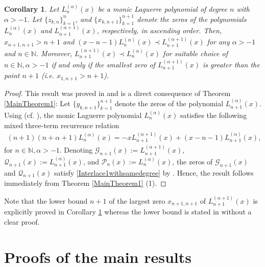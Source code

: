 \documentclass[final,3p,times,12pt]{elsarticle}
\newtheorem{corollary}{Corollary}[section]
\numberwithin{equation}{section}  %
\def\a{\alpha}
\begin{document}
\begin{corollary}\cite[Theorem 2.1]{Arvesu-Driver-Littlejohn-ITSF-2021}\label{interlaceLaguerre-n_a-n+1_a+1}
	Let $L^{(\alpha)}_n(x)$ be a monic Laguerre polynomial of degree $n$ with $\a>-1$. Let $\{z_{k,n}\}_{k=1}^{n}$, and  $\{x_{k,n+1}\}_{k=1}^{n+1}$ denote the zeros of the polynomials $L^{(\alpha)}_n(x)$ and $L^{(\alpha+1)}_{n+1}(x)$, respectively, in ascending order.  Then, $x_{n+1,n+1}>n+1$ and $(x-n-1)L^{(\alpha)}_n(x)\prec L^{(\alpha+1)}_{n+1}(x)$ for any $\alpha>-1$ and $n\in \mathbb{N}$. Moreover, $L^{(\alpha+1)}_{n+1}(x)\prec L^{(\alpha)}_n(x)$  for suitable choice of $n\in \mathbb{N}, \alpha>-1$ if and only if the smallest zero of $L^{(\alpha+1)}_{n+1}(x)$ is greater than the point $n+1$ (i.e. $x_{1,n+1}>n+1$).
\end{corollary}
\begin{proof} 
	This result was proved in \cite[Theorem 2.1]{Arvesu-Driver-Littlejohn-ITSF-2021} and is a direct consequence of Theorem \ref{MainTheorem1}: Let  $\{y_{k,n+1}\}_{k=1}^{n+1}$ denote the zeros of the polynomial $L^{(\alpha)}_{n+1}(x)$. Using (cf. \cite[eq.~(1)]{Driver-Jordaan-NumerMath-2007}), the monic Laguerre polynomial $L^{(\alpha)}_n(x)$ satisfies the following mixed three-term recurrence relation
	\begin{align}
		(n+1)(n+\alpha+1)L^{(\alpha)}_n(x)=-xL^{(\alpha+1)}_{n+1}(x)+(x-n-1)L^{(\alpha)}_{n+1}(x),
	\end{align}
	for $n\in \mathbb{N}, \alpha>-1$. Denoting $\mathcal{G}_{n+1}(x):=L^{(\alpha+1)}_{n+1}(x)$, $\mathcal{Q}_{n+1}(x):=L^{(\alpha)}_{n+1}(x)$, and $\mathcal{P}_n(x):=L^{(\alpha)}_n(x)$, the zeros of $\mathcal{G}_{n+1}(x)$ and $\mathcal{Q}_{n+1}(x)$ satisfy \eqref{Interlace1withsamedegree} by \cite[Theorem 2.3]{Driver-Jordaan-NumerMath-2007}. Hence, the result follows immediately from Theorem \ref{MainTheorem1} (1).
\end{proof}

Note that the lower bound $n+1$ of the largest zero $x_{n+1,n+1}$ of $L^{(\alpha+1)}_{n+1}(x)$ is explicitly proved in Corollary \ref{interlaceLaguerre-n_a-n+1_a+1} whereas the lower bound is stated in \cite[Theorem 2.1]{Arvesu-Driver-Littlejohn-ITSF-2021}  without a clear proof.


\section{Proofs of the main results}
\label{Proofs}
\end{document}
